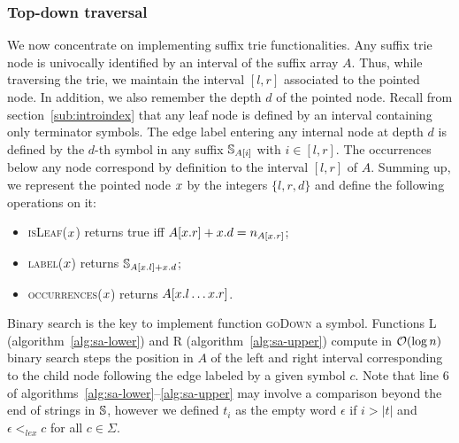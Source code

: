 \subsubsection{Top-down traversal}

We now concentrate on implementing suffix trie functionalities.
Any suffix trie node is univocally identified by an interval of the suffix array $A$.
Thus, while traversing the trie, we maintain the interval $[l,r]$ associated to the pointed node.
In addition, we also remember the depth $d$ of the pointed node.
Recall from section~\ref{sub:introindex} that any leaf node is defined by an interval containing only terminator symbols.
The edge label entering any internal node at depth $d$ is defined by the $d$-th symbol in any suffix $\mathbb {S}_{A[i]}$ with $i \in [l,r]$.
The occurrences below any node correspond by definition to the interval $[l,r]$ of $A$.
Summing up, we represent the pointed node $x$ by the integers $\{ l, r ,d \}$ and define the following operations on it:
\begin{itemize}
\item \textsc{isLeaf}($x$) returns true iff $A[x.r] + x.d = n_{A[x.r]}$;
\item \textsc{label}($x$) returns $\mathbb {S}_{A[x.l] + x.d}$;
\item \textsc{occurrences}($x$) returns $A[x.l \dots x.r]$.
\end{itemize}

Binary search is the key to implement function \textsc{goDown} a symbol.
Functions \textsc{L} (algorithm~\ref{alg:sa-lower}) and \textsc{R} (algorithm~\ref{alg:sa-upper}) compute in $\mathcal{O}(\log{n})$ binary search steps the position in $A$ of the left and right interval corresponding to the child node following the edge labeled by a given symbol $c$.
Note that line 6 of algorithms~\ref{alg:sa-lower}--\ref{alg:sa-upper} may involve a comparison beyond the end of strings in $\mathbb {S}$, however we defined $t_i$ as the empty word $\epsilon$ if $i > |t|$ and $\epsilon <_{lex} c$ for all $c \in \Sigma$.

